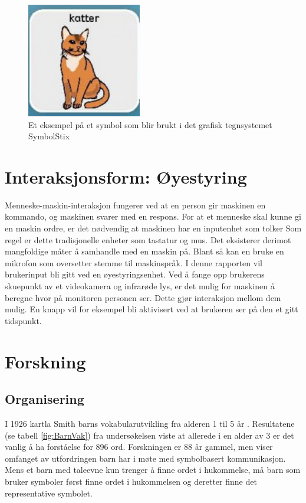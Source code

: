 \documentclass[phd,tocprelim]{cornell}
\begin{document}
\begin{figure}[ht!]
\centering
\includegraphics[width=50mm]{katt}
\caption{Et eksempel på et symbol som blir brukt i det grafisk tegnsystemet SymbolStix}
\label{fig:katt}
\end{figure}

\section{Interaksjonsform: Øyestyring}

Menneske-maskin-interaksjon fungerer ved at en person gir maskinen en kommando, og maskinen svarer med en respons. For at et menneske skal kunne gi en maskin ordre, er det nødvendig at maskinen har en inputenhet som tolker  Som regel er dette tradisjonelle enheter som tastatur og mus. Det eksisterer derimot mangfoldige måter å samhandle med en maskin på. Blant så kan en bruke en mikrofon som oversetter stemme til maskinspråk. I denne rapporten vil brukerinput bli gitt ved en øyestyringsenhet.  Ved å fange opp brukerens skuepunkt av et videokamera og infrarøde lys, er det mulig for maskinen å beregne hvor på monitoren personen ser. Dette gjør interaksjon mellom dem mulig. En knapp vil for eksempel bli aktivisert ved at brukeren ser på den et gitt tidspunkt. 




\section{Forskning}


\subsection{Organisering}


I 1926 kartla Smith\cite{Smith} barns vokabularutvikling fra alderen 1 til 5 år . Resultatene (se tabell \ref{fig:BarnVak}) fra undersøkelsen viste at allerede i en alder av 3 er det vanlig å ha forståelse for 896 ord. Forskningen er 88 år gammel, men viser omfanget av utfordringen barn har i møte med symbolbasert kommunikasjon. Mens et barn med taleevne kun trenger å finne ordet i hukommelse, må barn som bruker symboler først finne ordet i hukommelsen og deretter finne det representative symbolet. 
\end{document}
